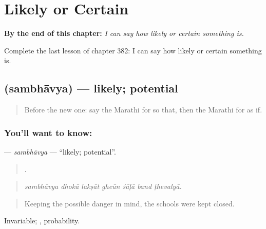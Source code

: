 
\chapter{Likely or Certain}
\label{ch:mr-likely-or-certain}

\begin{chapteropening}
\textbf{By the end of this chapter:} \emph{I can say how likely or certain something is.}

Complete the last lesson of chapter 382: I can say how likely or certain something is.
\end{chapteropening}

\section[\texorpdfstring{\mr{संभाव्य} (sambhāvya)}{संभाव्य (sambhāvya)}]{ (sambhāvya) — likely; potential}

\label{lesson:MR-C382-sambhavya}



\begin{quote}
Before the new one: say the Marathi for so that, then the Marathi for as if.
\end{quote}

\subsection*{You'll want to know: }
\textbf{} — \emph{sambhāvya} — \textquotedblleft{}likely; potential\textquotedblright{}.

\begin{quote}
      .
\end{quote}

\begin{quote}
\emph{sambhāvya dhokā lakṣāt gheūn śāḷā band ṭhevalyā.}
\end{quote}

\begin{quote}
Keeping the possible danger in mind, the schools were kept closed.
\end{quote}

Invariable; , probability.

